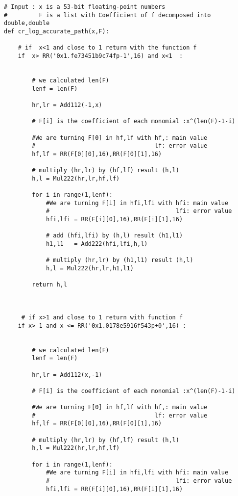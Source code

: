 \begin{lstlisting}
# Input : x is a 53-bit floating-point numbers 
#         F is a list with Coefficient of f decomposed into double,double 
def cr_log_accurate_path(x,F):

    # if  x<1 and close to 1 return with the function f 
    if  x> RR('0x1.fe73451b9c74fp-1',16) and x<1  :
       
       
        # we calculated len(F)
        lenf = len(F)
        
        hr,lr = Add112(-1,x)
       
        # F[i] is the coefficient of each monomial :x^(len(F)-1-i)
    
        #We are turning F[0] in hf,lf with hf,: main value
        #                                  lf: error value
        hf,lf = RR(F[0][0],16),RR(F[0][1],16)

        # multiply (hr,lr) by (hf,lf) result (h,l)
        h,l = Mul222(hr,lr,hf,lf)
       
        for i in range(1,lenf):
            #We are turning F[i] in hfi,lfi with hfi: main value
            #                                    lfi: error value
            hfi,lfi = RR(F[i][0],16),RR(F[i][1],16)

            # add (hfi,lfi) by (h,l) result (h1,l1)
            h1,l1   = Add222(hfi,lfi,h,l)

            # multiply (hr,lr) by (h1,l1) result (h,l)
            h,l = Mul222(hr,lr,h1,l1)
            
        return h,l

    
    
     # if x>1 and close to 1 return with function f
    if x> 1 and x <= RR('0x1.0178e5916f543p+0',16) :
       
       
        # we calculated len(F)
        lenf = len(F)
        
        hr,lr = Add112(x,-1)
       
        # F[i] is the coefficient of each monomial :x^(len(F)-1-i)
    
        #We are turning F[0] in hf,lf with hf,: main value
        #                                  lf: error value
        hf,lf = RR(F[0][0],16),RR(F[0][1],16)

        # multiply (hr,lr) by (hf,lf) result (h,l)
        h,l = Mul222(hr,lr,hf,lf)
       
        for i in range(1,lenf):
            #We are turning F[i] in hfi,lfi with hfi: main value
            #                                    lfi: error value
            hfi,lfi = RR(F[i][0],16),RR(F[i][1],16)


\end{lstlisting}
